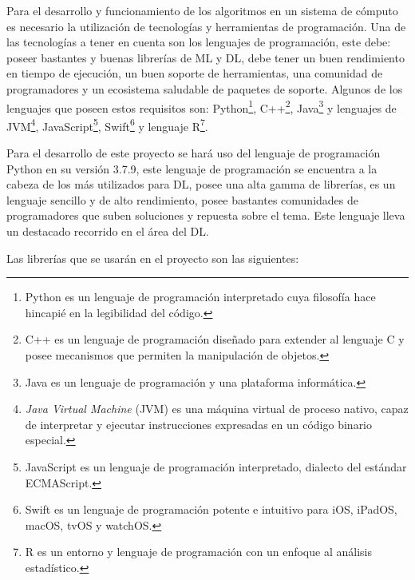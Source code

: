   Para el desarrollo y funcionamiento de los algoritmos en un sistema de c\'{o}mputo es necesario la utilizaci\'{o}n de tecnolog\'{i}as y herramientas de programaci\'{o}n. Una de las tecnolog\'{i}as a tener en cuenta son los lenguajes de programaci\'{o}n, este debe: poseer bastantes y buenas librer\'{i}as de ML y DL, debe tener un buen rendimiento en tiempo de ejecuci\'{o}n, un buen soporte de herramientas, una comunidad de programadores y un ecosistema saludable de paquetes de soporte. Algunos de los lenguajes que poseen estos requisitos son: Python\footnote{Python es un lenguaje de programaci\'{o}n interpretado cuya filosof\'{i}a hace hincapi\'{e} en la legibilidad del c\'{o}digo.}, C++\footnote{C++ es un lenguaje de programaci\'{o}n dise\~{n}ado para extender al lenguaje C y posee mecanismos que permiten la manipulaci\'{o}n de objetos.}, Java\footnote{Java es un lenguaje de programaci\'{o}n y una plataforma inform\'{a}tica.} y lenguajes de JVM\footnote{\textit{Java Virtual Machine} (JVM) es una m\'{a}quina virtual de proceso nativo, capaz de interpretar y ejecutar instrucciones expresadas en un c\'{o}digo binario especial.}, JavaScript\footnote{JavaScript es un lenguaje de programaci\'{o}n interpretado, dialecto del est\'{a}ndar ECMAScript.}, Swift\footnote{Swift es un lenguaje de programaci\'{o}n potente e intuitivo para iOS, iPadOS, macOS, tvOS y watchOS.} y lenguaje R\footnote{R es un entorno y lenguaje de programaci\'{o}n con un enfoque al an\'{a}lisis estad\'{i}stico.}.
  
  Para el desarrollo de este proyecto se hará uso del lenguaje de programaci\'{o}n Python en su versi\'{o}n 3.7.9, este lenguaje de programaci\'{o}n se encuentra a la cabeza de los m\'{a}s utilizados para DL, posee una alta gamma de librer\'{i}as, es un lenguaje sencillo y de alto rendimiento, posee bastantes comunidades de programadores que suben soluciones y repuesta sobre el tema. Este lenguaje lleva un destacado recorrido en el \'{a}rea del DL.

  Las librer\'{i}as que se usar\'{a}n en el proyecto son las siguientes:
  
